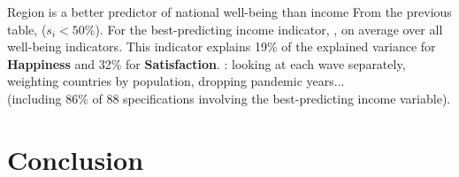 \documentclass[aspectratio=169,xcolor=dvipsnames, 11pt,mathserif]{beamer}
\begin{document}
\begin{frame}{Region is a better predictor of national well-being than income}
    \bbsp
    \ip From the previous table,  ($s_i < 50\%$).
    \ip For the best-predicting income indicator, , on average over all well-being indicators.
    \ip This indicator explains 19\% of the explained variance for \textbf{Happiness} and 32\% for \textbf{Satisfaction}.
    \ip {}: looking at each wave separately, weighting countries by population, dropping pandemic years... \\(including 86\% of 88 specifications involving the best-predicting income variable). \hyperlink{share_gdp_add}{}
    \ee
\end{frame}

\section{Conclusion}
\end{document}
